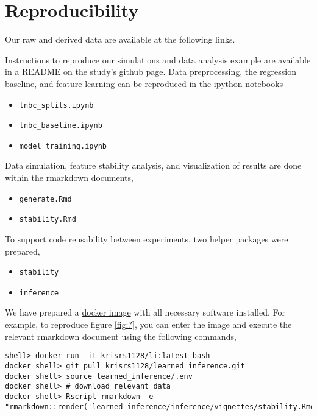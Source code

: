 
\section{Reproducibility}

Our raw and derived data are available at the following links.

Instructions to reproduce our simulations and data analysis example are
available in a \href{https://github.com/krisrs1128/learned_inference}{README} on
the study's github page. Data preprocessing, the regression baseline, and
feature learning can be reproduced in the ipython notebooks

\begin{itemize}
\item \texttt{tnbc\_splits.ipynb}
\item \texttt{tnbc\_baseline.ipynb}
\item \texttt{model\_training.ipynb}
\end{itemize}

Data simulation, feature stability analysis, and visualization of results are
done within the rmarkdown documents,

\begin{itemize}
\item \texttt{generate.Rmd}
\item \texttt{stability.Rmd}
\end{itemize}

To support code reusability between experiments, two helper packages were prepared,

\begin{itemize}
\item \texttt{stability}
\item \texttt{inference}
\end{itemize}

We have prepared a \href{https://hub.docker.com/r/krisrs1128/li}{docker image}
with all necessary software installed. For example, to reproduce figure
\ref{fig:?}, you can enter the image and execute the relevant rmarkdown document
using the following commands,

\begin{verbatim}
shell> docker run -it krisrs1128/li:latest bash
docker shell> git pull krisrs1128/learned_inference.git
docker shell> source learned_inference/.env
docker shell> # download relevant data
docker shell> Rscript rmarkdown -e "rmarkdown::render('learned_inference/inference/vignettes/stability.Rmd')"
\end{verbatim}

